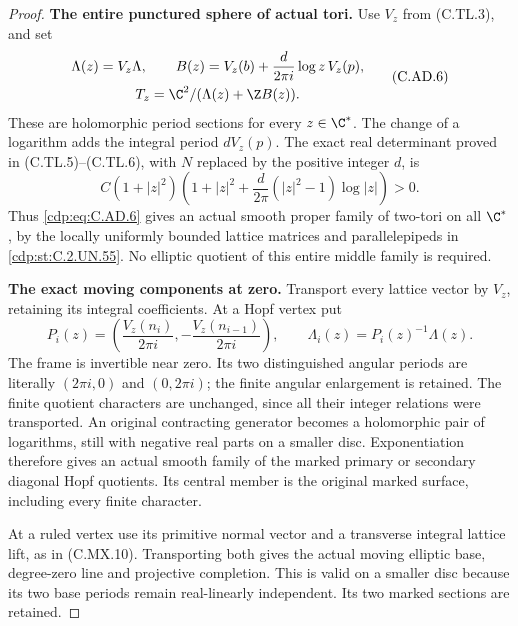 \begin{proof}
\par\medskip\noindent\textbf{The entire punctured sphere of actual tori.}
Use $V_z$ from (C.TL.3), and set
\[
 \begin{gathered}
 \Lambda(z)=V_z\Lambda,\qquad
 B(z)=V_z(b)+\frac{d}{2\pi i}\log z\,V_z(p),\\
                   T_z=\C^2/(\Lambda(z)+\Z B(z)).
 \end{gathered}                                        \tag{C.AD.6}\label{cdp:eq:C.AD.6}
\]
These are holomorphic period sections for every $z\in\C^*$.
The change of a logarithm adds the integral period $dV_z(p)$.
The exact real determinant proved in (C.TL.5)--(C.TL.6), with
$N$ replaced by the positive integer $d$, is
\[
 C(1+|z|^2)\left(1+|z|^2+
          \frac{d}{2\pi}(|z|^2-1)\log|z|\right)>0.
                                                        \tag{C.AD.7}\label{cdp:eq:C.AD.7}
\]
Thus \eqref{cdp:eq:C.AD.6} gives an actual smooth proper family of two-tori
on all $\C^*$, by the locally uniformly bounded lattice
matrices and parallelepipeds in \ref{cdp:st:C.2.UN.55}. No elliptic quotient
of this entire middle family is required.

\par\medskip\noindent\textbf{The exact moving components at zero.}
Transport every lattice vector by $V_z$, retaining its integral
coefficients. At a Hopf vertex put
\[
 P_i(z)=\left(\frac{V_z(n_i)}{2\pi i},
                       -\frac{V_z(n_{i-1})}{2\pi i}\right),
 \qquad \Lambda_i(z)=P_i(z)^{-1}\Lambda(z).
                                                        \tag{C.AD.8}\label{cdp:eq:C.AD.8}
\]
The frame is invertible near zero. Its two distinguished
angular periods are literally $(2\pi i,0)$ and $(0,2\pi i)$;
the finite angular enlargement is retained. The finite quotient characters
are unchanged, since all their integer relations were
transported. An original contracting generator becomes a
holomorphic pair of logarithms, still with negative real
parts on a smaller disc. Exponentiation therefore gives an
actual smooth family of the marked primary or secondary
diagonal Hopf quotients. Its central member is the original
marked surface, including every finite character.

At a ruled vertex use its primitive normal vector and a
transverse integral lattice lift, as in (C.MX.10). Transporting
both gives the actual moving elliptic base, degree-zero line
and projective completion. This is valid on a smaller disc
because its two base periods remain real-linearly independent.
Its two marked sections are retained.


\end{proof}
